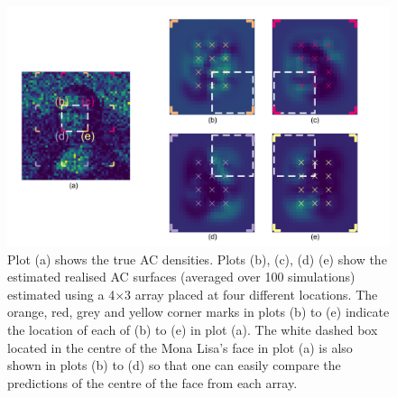 \documentclass[10pt,a4paper]{article}
\begin{document}

\begin{figure}[htbp]
\centering
\includegraphics[width=1\textwidth]{mona_torch_higheffort.png}
\caption{Plot (a) shows the true AC densities. Plots (b), (c), (d) (e) show the estimated realised AC surfaces (averaged over 100 simulations) estimated using a 4$\times$3 array placed at four different locations. The orange, red, grey and yellow corner marks in plots (b) to (e) indicate the location of each of (b) to (e) in plot (a). The white dashed box located in the centre of the Mona Lisa's face in plot (a) is also shown in plots (b) to (d) so that one can easily compare the predictions of the centre of the face from each array.}
\label{mona_torch_higheffort}
\end{figure}
\end{document}
